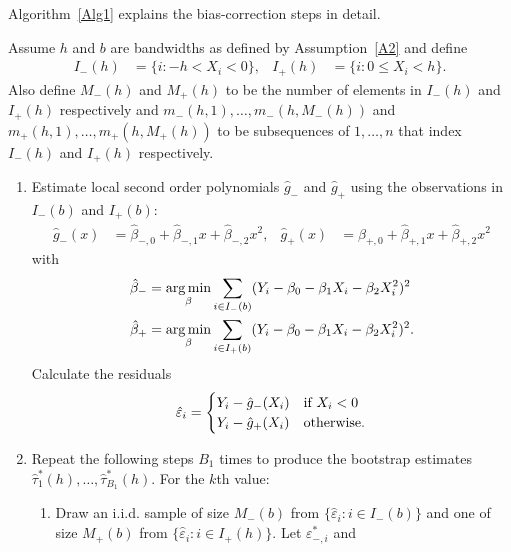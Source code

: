 \documentclass[12pt,fleqn]{article}
\begin{document}
Algorithm~\ref{Alg1} explains the bias-correction steps in detail.

\begin{algorithm}\label{Alg1}
  Assume $h$ and $b$ are bandwidths as defined by Assumption~\ref{A2} and define
  \begin{align*}
    I_-(h) &= \{i : -h < X_{i} < 0\}, &
    I_+(h) &= \{i : 0 \leq X_{i} < h\}.
  \end{align*}
  Also define $M_-(h)$ and $M_+(h)$ to be the number of elements in $I_-(h)$ and
  $I_+(h)$ respectively and $m_-(h,1),\dots,m_-(h,M_-(h))$ and
  $m_+(h,1),\dots,m_+(h,M_+(h))$ to be subsequences of $1,\dots,n$ that index
  $I_-(h)$ and $I_+(h)$ respectively.
  \begin{enumerate}
  \item Estimate local second order polynomials $\hat g_-$ and $\hat g_+$ using
    the observations in $I_-(b)$ and $I_+(b)$:
    \begin{align}
      \label{eq:2}
      \hat g_-(x)
      &= \hat\beta_{-,0} + \hat\beta_{-,1} x + \hat\beta_{-,2} x^2,
      &\hat g_+(x)
      &= \hat\beta_{+,0} + \hat\beta_{+,1} x + \hat\beta_{+,2} x^2
    \end{align}
    with
    \begin{align*}
      \hat\beta_- &= \operatorname*{arg\,min}_\beta \sum_{i \in I_-(b)}
      (Y_i - \beta_0 - \beta_1 X_i - \beta_2 X_i^2)^2 \\
      \hat\beta_+ &= \operatorname*{arg\,min}_\beta \sum_{i \in I_+(b)}
      (Y_i - \beta_0 - \beta_1 X_i - \beta_2 X_i^2)^2.
    \end{align*}
    Calculate the residuals
    \begin{equation}
      \label{eq:3}
      \hat\varepsilon_{i} =
      \begin{cases}
        Y_{i} - \hat g_-(X_{i}) & \text{if}\ X_{i} < 0 \\
        Y_{i} - \hat g_+(X_{i}) & \text{otherwise}.
      \end{cases}
    \end{equation}
  \item Repeat the following steps $B_1$ times to produce the
    bootstrap estimates $\hat\tau_1^*(h),\dots,\hat\tau_{B_1}^*(h)$. For the
    $k$th value:
    \begin{enumerate}
    \item Draw an i.i.d. sample of size $M_-(b)$ from
      $\{\hat\varepsilon_i : i \in I_-(b)\}$ and one of size $M_+(b)$ from
      $\{\hat\varepsilon_i : i \in I_+(h)\}$. Let $\varepsilon_{-,i}^{*}$ and

\end{enumerate}
\end{enumerate}
\end{algorithm}
\end{document}
